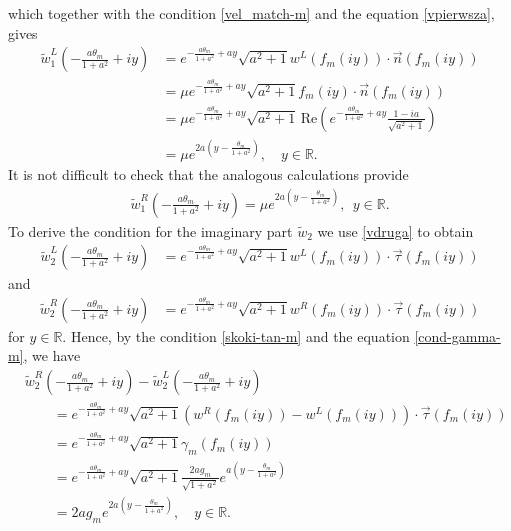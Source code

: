 \documentclass[11pt, letterpaper, reqno]{amsart}
\numberwithin{equation}{section}
\theoremstyle{definition}
\theoremstyle{plain}
\numberwithin{equation}{section}
\def\R{\mathbb{R}}
\begin{document}
which together with the condition \eqref{vel_match-m} and the equation \eqref{vpierwsza}, gives
\begin{equation}
\begin{aligned}\label{eq-bound-11}
\tilde{w}_{1}^{L}\left(-\frac{a\theta_{m}}{1+a^{2}} + i y\right) & = e^{-\frac{a\theta_{m}}{1+a^{2}} + a y}\sqrt{a^2+1}w^{L}(f_{m}(iy))\cdot \vec{n}(f_{m}(iy)) \\
& = \mu e^{-\frac{a\theta_{m}}{1+a^{2}} + a y} \sqrt{a^2+1} f_{m}(iy) \cdot \vec{n}(f_{m}(iy)) \\
& = \mu e^{-\frac{a\theta_{m}}{1+a^{2}} + a y} \sqrt{a^2+1} \,\mathrm{Re}\!\left(e^{-\frac{a\theta_{m}}{1+a^{2}}+ay} \frac{1-ia}{\sqrt{a^2+1}}\right) \\
& = \mu e^{2a(y-\frac{\theta_{m}}{1+a^{2}})}, \quad y\in\R.
\end{aligned}
\end{equation}
It is not difficult to check that the analogous calculations provide
\begin{align}\label{eq-bound-22}
\tilde{w}_{1}^{R}\left(-\frac{a\theta_{m}}{1+a^{2}} + i y\right) = \mu e^{2a(y-\frac{\theta_{m}}{1+a^{2}})}, \ \ y\in\R.
\end{align}
To derive the condition for the imaginary part $\tilde w_{2}$ we use \eqref{vdruga} to obtain 
\begin{align*}
\tilde{w}_{2}^{L}\left(-\frac{a\theta_{m}}{1+a^{2}} + i y\right) & = e^{-\frac{a\theta_{m}}{1+a^{2}} + a y} \sqrt{a^2+1}  w^{L}(f_{m}(iy)) \cdot \vec{\tau}(f_{m}(iy))
\end{align*}
and
\begin{align*}
\tilde{w}_{2}^{R}\left(-\frac{a\theta_{m}}{1+a^{2}} + i y\right) & = e^{-\frac{a\theta_{m}}{1+a^{2}} + a y} \sqrt{a^2+1}  w^{R}(f_{m}(iy)) \cdot \vec{\tau}(f_{m}(iy)) 
\end{align*}
for $y\in\R$. Hence, by the condition \eqref{skoki-tan-m} and the equation \eqref{cond-gamma-m}, we have 
\begin{equation}
\begin{aligned}\label{eq-bound-2bb}
&\tilde{w}_{2}^{R}\left(-\frac{a\theta_{m}}{1+a^{2}} + i y\right) - \tilde{w}_{2}^{L}\left(-\frac{a\theta_{m}}{1+a^{2}} + i y\right) \\
&\qquad = e^{-\frac{a\theta_{m}}{1+a^{2}} + a y} \sqrt{a^2+1}  (w^{R}(f_{m}(iy)) - w^{L}(f_{m}(iy))) \cdot \vec{\tau}(f_{m}(iy)) \\
&\qquad = e^{-\frac{a\theta_{m}}{1+a^{2}} + a y} \sqrt{a^2+1}\gamma_{m}(f_{m}(iy)) \\
&\qquad = e^{-\frac{a\theta_{m}}{1+a^{2}} + a y} \sqrt{a^2+1} \frac{2ag_{m}}{\sqrt{1+a^{2}}} e^{a(y - \frac{\theta_{m}}{1+a^{2}})} \\
&\qquad = 2ag_{m} e^{2a(y - \frac{\theta_{m}}{1+a^{2}})}, \quad y\in\R.
\end{aligned}
\end{equation}
\end{document}
